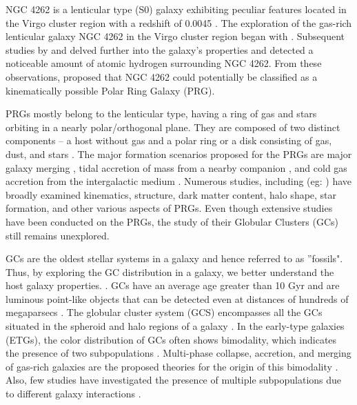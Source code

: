 \documentclass[fleqn,usenatbib]{mnras}
\begin{document}
NGC 4262 is a lenticular type (S0) galaxy exhibiting peculiar features located in the Virgo cluster region with a redshift of 0.0045 \citep{whitmore1990}. The exploration of the gas-rich lenticular galaxy NGC 4262 in the Virgo cluster region began with \citet{1983Giovanardi}. Subsequent studies by \citet{1985krum} and \citet{1987vanDriel} delved further into the galaxy's properties and detected a noticeable amount of atomic hydrogen surrounding NGC 4262. From these observations, \citet{whitmore1990} proposed that NGC 4262 could potentially be classified as a kinematically possible Polar Ring Galaxy (PRG). \par
PRGs mostly belong to the lenticular type, having a ring of gas and stars orbiting in a nearly polar/orthogonal plane. They are composed of two distinct components -- a host without gas \citep{finkelman2012} and a polar ring or a disk consisting of gas, dust, and stars \citep{reshkinov1997,2019Reshetnikov}. The major formation scenarios proposed for the PRGs are major galaxy merging \citep{1998ApJ...499..635B,2003Bournaudcombes}, tidal accretion of mass from a nearby companion \citep{1997A&A...325..933R,2003Bournaudcombes}, and cold gas accretion from the intergalactic medium \citep{2008ApJ...689..678B,2019Egorov}. Numerous studies, including (eg: \citet{reshkinov1997,2014Iodice,2014Khoperskov,2015Moiseev,2015Spavone,ordernes2016A&A...585A.156O,2020Smirnova,2023Deg,2024Smirnov}) have broadly examined kinematics, structure, dark matter content, halo shape, star formation, and other various aspects of PRGs. Even though extensive studies have been conducted on the PRGs, the study of their Globular Clusters (GCs) still remains unexplored. \par 
GCs are the oldest stellar systems in a galaxy and hence referred to as ''fossils". Thus, by exploring the GC distribution in a galaxy, we better understand the host galaxy properties. \citep{forbed1997,2brodieandstrader006ARA&A..44..193B,Beasley2020rfma.book..245B}. GCs have an average age greater than 10 Gyr and are luminous point-like objects that can be detected even at distances of hundreds of megaparsecs \citep{2011Peng,2014Harris}. The globular cluster system (GCS) encompasses all the GCs situated in the spheroid and halo regions of a galaxy \citep{Harris1991,ashmanzepf1992}. In the early-type galaxies (ETGs), the color distribution of GCs often shows bimodality, which indicates the presence of two subpopulations \citep{Harris1991,Peng2006,Hagrisrhode2014,2022deBritosilvajplus}. Multi-phase collapse, accretion, and merging of gas-rich galaxies are the proposed theories for the origin of this bimodality \citep{forbed1997,2008Bournaud,2014LiandGnedin,2022LiandVogelsberger}. Also, few studies have investigated the presence of multiple subpopulations due to different galaxy interactions \citep{2015Caso,2012Blom,2020Escudero,2022Escudero}.
\end{document}
